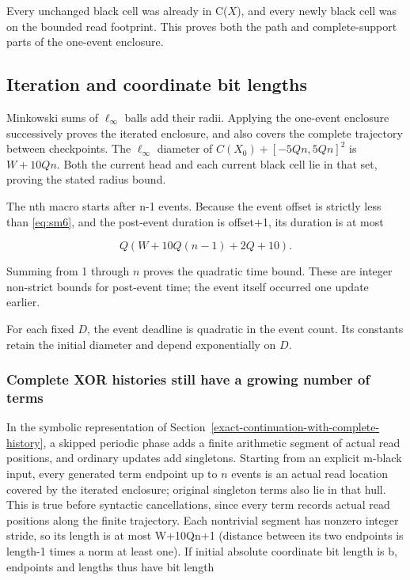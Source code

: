 \documentclass[
  11pt,
]{article}
\begin{document}
Every unchanged black cell was already in C(\(X\)), and every newly black
cell was on the bounded read footprint. This proves both the path and
complete-support parts of the one-event enclosure.

\subsection{Iteration and coordinate bit lengths}\label{geo-5}

Minkowski sums of $\ell_\infty$ balls add their radii. Applying the one-event
enclosure successively proves the iterated enclosure, and also covers the complete trajectory
between checkpoints. The $\ell_\infty$ diameter of
$C(X_0)+[-5Qn,5Qn]^2$ is $W+10Qn$. Both the current head and each
current black cell lie in that set, proving the stated radius bound.

The nth macro starts after n-1 events. Because the event offset is strictly less than \eqref{eq:sm6}, and the post-event duration is offset+1, its duration is at most

\[
Q(W+10Q(n-1)+2Q+10).
\]

Summing from 1 through \(n\) proves the quadratic time bound. These are integer non-strict
bounds for post-event time; the event itself occurred one update
earlier.

For each fixed $D$, the event deadline is quadratic in the event count.
Its constants retain the initial diameter and depend exponentially on $D$.

\subsubsection{Complete XOR histories still have a growing number of
terms}\label{complete-xor-histories-still-have-a-growing-number-of-terms}

In the symbolic representation of Section~\ref{exact-continuation-with-complete-history}, a skipped periodic phase adds a
finite arithmetic segment of actual read positions, and ordinary updates
add singletons. Starting from an explicit m-black input, every generated
term endpoint up to \(n\) events is an actual read location covered by the iterated enclosure;
original singleton terms also lie in that hull. This is true before
syntactic cancellations, since every term records actual read positions
along the finite trajectory. Each nontrivial segment has
nonzero integer stride, so its length is at most W+10Qn+1 (distance
between its two endpoints is length-1 times a norm at least one). If
initial absolute coordinate bit length is b, endpoints and lengths thus
have bit length
\end{document}
